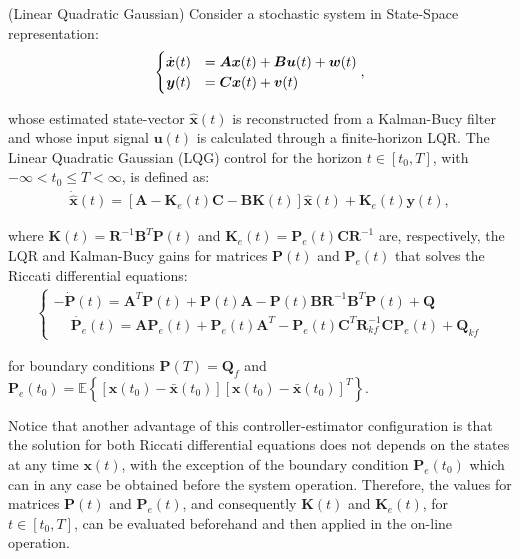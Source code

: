 \documentclass[a4paper,11pt]{book}
\numberwithin{figure}{chapter}
\numberwithin{equation}{chapter}
\numberwithin{table}{chapter}
\theoremstyle{definition}
\newtheorem{definition}{Definition}[chapter]
\newcounter{boxed-theorem}
\newcounter{boxed-definition}
\newenvironment{boxed-definition}[1]
{\colorlet{shadecolor}{pastelYellow!15} \begin{shaded} \begin{definition}{#1}}
{\end{definition} \end{shaded}}
\newcounter{boxed-example}
\begin{document}
\begin{boxed-definition}{(Linear Quadratic Gaussian)} \label{def:lqg}
    Consider a stochastic system in State-Space representation:
	\begin{align}
    \begin{cases}
        \hfill \dot{\bm{x}}(t) &= \bm{A} \bm{x}(t) + \bm{B} \bm{u}(t) + \bm{w}(t) \\
        \hfill \bm{y}(t) &= \bm{C} \bm{x}(t) + \bm{v}(t)
    \end{cases}
    ,\end{align}
    
     \noindent whose estimated state-vector $\hat{\bm{x}}(t)$ is reconstructed from a Kalman-Bucy filter and whose input signal $\bm{u}(t)$ is calculated through a finite-horizon LQR. The Linear Quadratic Gaussian (LQG) control for the horizon $t \in [t_0, T]$, with $-\infty < t_0 \leq T < \infty$, is defined as:
    \begin{align} \label{eq:lqg01}
        \dot{\hat{\bm{x}}}(t) = \left[\bm{A} - \bm{K}_e(t) \bm{C} - \bm{B} \bm{K}(t) \right] \hat{\bm{x}}(t) + \bm{K}_e(t) \bm{y}(t) 
    ,\end{align}
    
    \noindent where $\bm{K}(t) = \bm{R}^{-1}\bm{B}^T \bm{P}(t)$ and $\bm{K}_e(t) = \bm{P}_e(t) \bm{C} \bm{R}^{-1}$ are, respectively, the LQR and Kalman-Bucy gains for matrices $\bm{P}(t)$ and $\bm{P}_e(t)$ that solves the Riccati differential equations:
    \begin{align}
    \begin{cases}
        -\dot{\bm{P}}(t) = \bm{A}^T \bm{P}(t) + \bm{P}(t) \bm{A} - \bm{P}(t) \bm{B} \bm{R}^{-1} \bm{B}^T \bm{P}(t) + \bm{Q} \\
        \phantom{-} \dot{\bm{P}_e}(t) = \bm{A} \bm{P}_e(t) + \bm{P}_e(t) \bm{A}^T - \bm{P}_e(t)\bm{C}^T\bm{R}_{kf}^{-1} \bm{C} \bm{P}_e(t) + \bm{Q}_{kf}
    \end{cases}
    \end{align}
    
    \noindent for boundary conditions $\bm{P}(T) = \bm{Q}_f$ and $\bm{P}_e(t_0) = \mathbb{E} \left\{ [\bm{x}(t_0) - \bar{\bm{x}}(t_0)][\bm{x}(t_0) - \bar{\bm{x}}(t_0)]^T \right\}$.
\end{boxed-definition}

Notice that another advantage of this controller-estimator configuration is that the solution for both Riccati differential equations does not depends on the states at any time $\bm{x}(t)$, with the exception of the boundary condition $\bm{P}_e(t_0)$ which can in any case be obtained before the system operation. Therefore, the values for matrices $\bm{P}(t)$ and $\bm{P}_e(t)$, and consequently $\bm{K}(t)$ and $\bm{K}_e(t)$, for $t \in [t_0, T]$, can be evaluated beforehand and then applied in the on-line operation.
\end{document}
